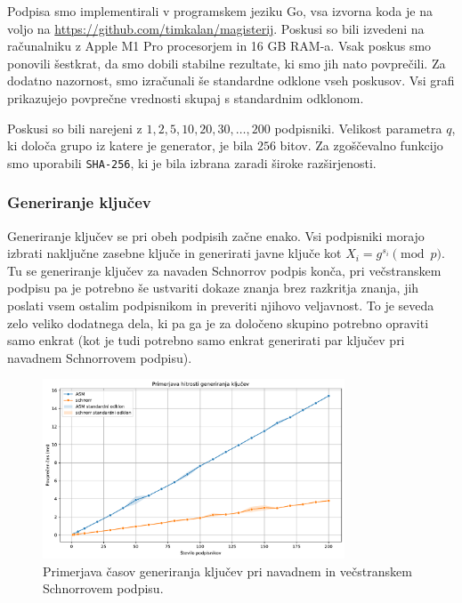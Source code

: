 \documentclass[isrm2, tisk]{fmfdelo}
\begin{document}
Podpisa smo implementirali v programskem jeziku Go, vsa izvorna koda je na voljo na
\href{https://github.com/timkalan/magisterij}{https://github.com/timkalan/magisterij}. Poskusi so
bili izvedeni na računalniku z Apple M1 Pro procesorjem in 16 GB RAM-a. Vsak poskus smo ponovili
šestkrat, da smo dobili stabilne rezultate, ki smo jih nato povprečili. Za dodatno nazornost, smo
izračunali še standardne odklone vseh poskusov. Vsi grafi prikazujejo povprečne vrednosti skupaj s
standardnim odklonom.

Poskusi so bili narejeni z $1, 2, 5, 10, 20, 30, \dots, 200$ podpisniki. Velikost parametra $q$, ki
določa grupo iz katere je generator, je bila $256$ bitov. Za zgoščevalno funkcijo smo uporabili
\texttt{SHA-256}, ki je bila izbrana zaradi široke razširjenosti.

\subsubsection{Generiranje ključev}
Generiranje ključev se pri obeh podpisih začne enako. Vsi podpisniki morajo izbrati naključne zasebne
ključe in generirati javne ključe kot $X_i = g^{s_i} \pmod p$. Tu se generiranje ključev za navaden
Schnorrov podpis konča, pri večstranskem podpisu pa je potrebno še ustvariti dokaze znanja brez
razkritja znanja, jih poslati vsem ostalim podpisnikom in preveriti njihovo veljavnost. To je seveda
zelo veliko dodatnega dela, ki pa ga je za določeno skupino potrebno opraviti samo enkrat (kot je
tudi potrebno samo enkrat generirati par ključev pri navadnem Schnorrovem podpisu).

\begin{figure}[ht]
  \centering
  \includegraphics[width=0.8\textwidth]{images/benchmark_KeyGeneration.pdf}
  \caption[Generiranje ključev.]{Primerjava časov generiranja ključev pri navadnem in večstranskem
    Schnorrovem podpisu.}
  \label{fig:generiranje}
\end{figure}
\end{document}
